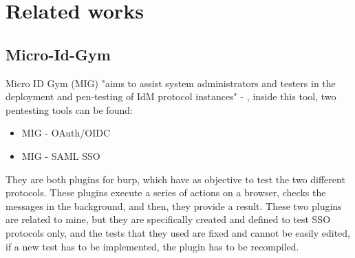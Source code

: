 \chapter{Related works}
\label{chap:Related_work}

\section{Micro-Id-Gym}
\label{sec:micro-id-gym}
Micro ID Gym (MIG) "aims to assist system administrators and testers in the deployment and pen-testing of IdM protocol instances" - \cite{micro_id_gym}, inside this tool, two pentesting tools can be found:
\begin{itemize}
    \item MIG - OAuth/OIDC \cite{claudio_grisenti}
    \item MIG - SAML SSO \cite{stefano_facchini}
\end{itemize}
They are both plugins for \Gls{burp}, which have as objective to test the two different protocols. These plugins execute a series of actions on a browser, checks the messages in the background, and then, they provide a result.
These two plugins are related to mine, but they are specifically created and defined to test SSO protocols only, and the tests that they used are fixed and cannot be easily edited, if a new test has to be implemented, the plugin has to be recompiled.

